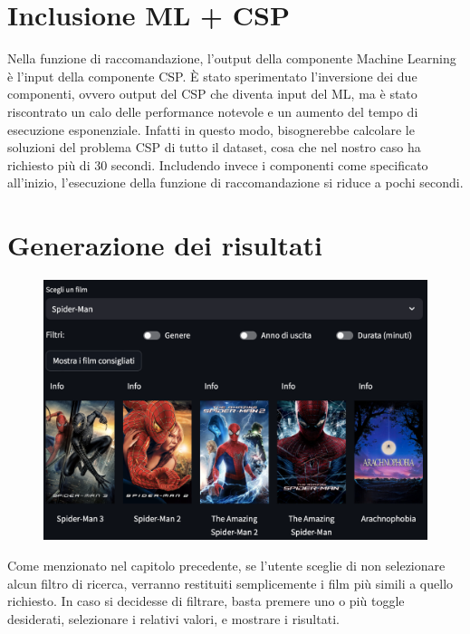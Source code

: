 \documentclass{report}
\begin{document}
    \section{Inclusione ML + CSP}
        Nella funzione di raccomandazione, l'output della componente Machine Learning è l'input della componente CSP. È stato sperimentato l'inversione dei due componenti, ovvero output del CSP che diventa input del ML, ma è stato riscontrato un calo delle performance notevole e un aumento del tempo di esecuzione esponenziale. Infatti in questo modo, bisognerebbe calcolare le soluzioni del problema CSP di tutto il dataset, cosa che nel nostro caso ha richiesto più di 30 secondi. Includendo invece i componenti come specificato all'inizio, l'esecuzione della funzione di raccomandazione si riduce a pochi secondi.
    \section{Generazione dei risultati}
        \begin{figure}[h]
            \centering
            \includegraphics[width=1\linewidth]{screenshot/ricerca_nofilters.png}
        \end{figure}
        Come menzionato nel capitolo precedente, se l'utente sceglie di non selezionare alcun filtro di ricerca, verranno restituiti semplicemente i film più simili a quello richiesto. 
        In caso si decidesse di filtrare, basta premere uno o più toggle desiderati, selezionare i relativi valori, e mostrare i risultati.
\end{document}
